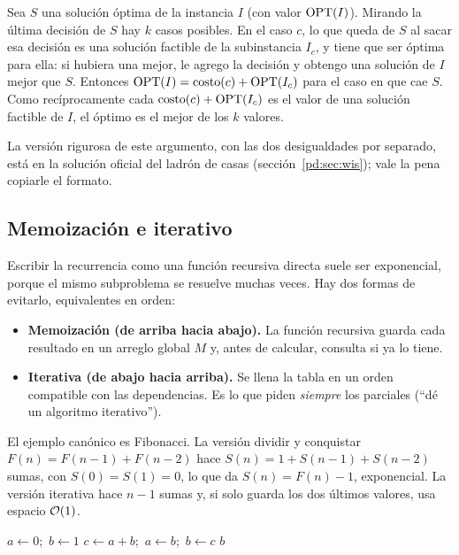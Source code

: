 \begin{resultado}
Sea $S$ una solución óptima de la instancia $I$ (con valor $\mathrm{OPT}(I)$).
Mirando la última decisión de $S$ hay $k$ casos posibles. En el caso $c$, lo
que queda de $S$ al sacar esa decisión es una solución factible de la
subinstancia $I_c$, y tiene que ser óptima para ella: si hubiera una mejor,
le agrego la decisión y obtengo una solución de $I$ mejor que $S$. Entonces
$\mathrm{OPT}(I)=\text{costo}(c)+\mathrm{OPT}(I_c)$ para el caso en que cae $S$. Como
recíprocamente cada $\text{costo}(c)+\mathrm{OPT}(I_c)$ es el valor de una solución
factible de $I$, el óptimo es el mejor de los $k$ valores.
\end{resultado}

La versión rigurosa de este argumento, con las dos desigualdades por
separado, está en la solución oficial del ladrón de casas
(sección~\ref{pd:sec:wis}); vale la pena copiarle el formato.

\subsection{Memoización e iterativo}

Escribir la recurrencia como una función recursiva directa suele ser
exponencial, porque el mismo subproblema se resuelve muchas veces. Hay dos
formas de evitarlo, equivalentes en orden:
\begin{itemize}
  \item \textbf{Memoización (de arriba hacia abajo).} La función recursiva
  guarda cada resultado en un arreglo global $M$ y, antes de calcular,
  consulta si ya lo tiene.
  \item \textbf{Iterativa (de abajo hacia arriba).} Se llena la tabla en un
  orden compatible con las dependencias. Es lo que piden \emph{siempre} los
  parciales (``dé un algoritmo iterativo'').
\end{itemize}

El ejemplo canónico es Fibonacci. La versión dividir y conquistar
$F(n)=F(n-1)+F(n-2)$ hace $S(n)=1+S(n-1)+S(n-2)$ sumas, con $S(0)=S(1)=0$,
lo que da $S(n)=F(n)-1$, exponencial. La versión iterativa hace $n-1$
sumas y, si solo guarda los dos últimos valores, usa espacio
$\mathcal{O}(1)$.

\begin{algorithmic}[1]
  \State $a \gets 0$;\ $b \gets 1$ 
    \State $c \gets a+b$;\ $a \gets b$;\ $b \gets c$
  \EndFor
  \State \Return $b$
\EndFunction
\end{algorithmic}

